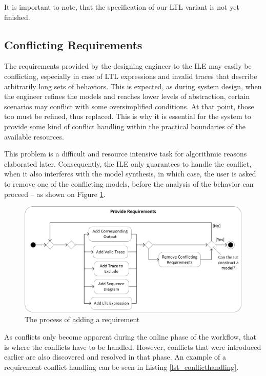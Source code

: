 It is important to note, that the specification of our LTL variant is not yet finished.

\subsection{Conflicting Requirements} \label{subs_conf}
The requirements provided by the designing engineer to the ILE may easily be conflicting, especially in case of LTL expressions and invalid traces that describe arbitrarily long sets of behaviors. This is expected, as during system design, when the engineer refines the models and reaches lower levels of abstraction, certain scenarios may conflict with some oversimplified conditions. At that point, those too must be refined, thus replaced. This is why it is essential for the system to provide some kind of conflict handling within the practical boundaries of the available resources. 

This problem is a difficult and resource intensive task for algorithmic reasons elaborated later. Consequently, the ILE only guarantees to handle the conflict, when it also interferes with the model synthesis, in which case, the user is asked to remove one of the conflicting models, before the analysis of the behavior can proceed -- as shown on Figure \ref{fig_providerequirementsworkflow}.

\begin{figure}[H] 
	\centering
		\includegraphics[width=130mm, keepaspectratio]{figures/methodology_providerequirementsworkflow.png}
	\caption{The process of adding a requirement}
	\label{fig_providerequirementsworkflow}
\end{figure}


As conflicts only become apparent during the online phase of the workflow, that is where the conflicts have to be handled. However, conflicts that were introduced earlier are also discovered and resolved in that phase. An example of a requirement conflict handling can be seen in Listing \ref{lst_conflicthandling}.


